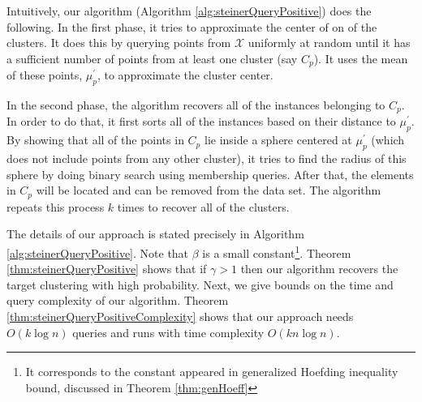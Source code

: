 \documentclass[orivec]{llncs}
\newcommand{\mc}{\mathcal}
\begin{document}

Intuitively, our algorithm (Algorithm  \ref{alg:steinerQueryPositive}) does the following. In the first phase, it tries to approximate the center of on of the clusters. It does this by querying points from $\mc X$ uniformly at random until it has a sufficient number of points from at least one cluster (say $C_p$). It uses the mean of these points, $\mu_p^\prime$, to approximate the cluster center. 

In the second phase, the algorithm recovers all of the instances belonging to $C_p$. In order to do that, it first sorts all of the instances based on their distance to $\mu_p^\prime$. By showing that all of the points in $C_p$ lie inside a sphere centered at $\mu_p^\prime$ (which does not include points from any other cluster), it tries to find the radius of this sphere by doing binary search using membership queries. After that, the elements in $C_p$ will be located and can be removed from the data set. The algorithm repeats this process $k$ times to recover all of the clusters.



The details of our approach is stated precisely in Algorithm \ref{alg:steinerQueryPositive}. Note that $\beta$ is a small constant\footnote{It corresponds to the constant appeared in generalized Hoefding inequality bound, discussed in Theorem \ref{thm:genHoeff}}. Theorem \ref{thm:steinerQueryPositive} shows that if $\gamma > 1$ then our algorithm recovers the target clustering with high probability. Next, we give bounds on the time and query complexity of our algorithm. Theorem \ref{thm:steinerQueryPositiveComplexity} shows that our approach needs $O(k\log n)$ queries and runs with time complexity $O(kn\log n)$.
\end{document}
